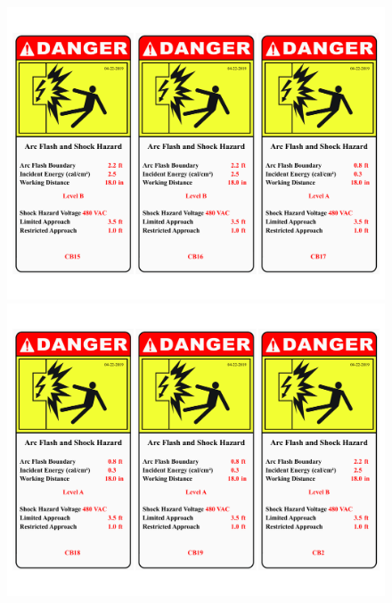 \begin{figure}
\begin{minipage}[b]{0.5\linewidth}
\end{minipage}
\hspace{0.03cm}
\begin{minipage}[b]{0.5\linewidth}
	\centering
	\includegraphics[width=\textwidth]{figures/R1P_systemdesign/fig_ch04_elecaudit_arflashlable03}
\end{minipage}
\hspace{0.03cm}
\begin{minipage}[b]{0.5\linewidth}
	\centering
	\includegraphics[width=\textwidth]{figures/R1P_systemdesign/fig_ch04_elecaudit_arflashlable04}
\end{minipage}
\hspace{0.03cm}

\end{figure}
